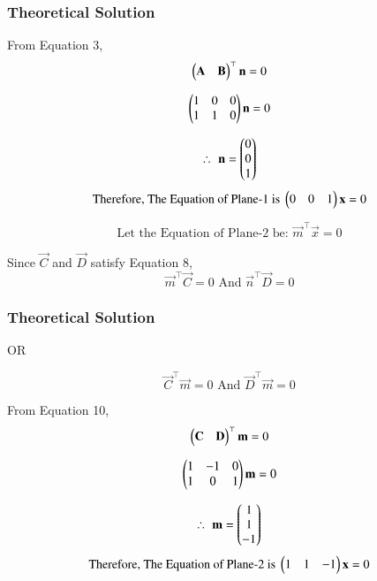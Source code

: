 \documentclass{beamer}
\begin{document}
\begin{frame}[fragile]
\frametitle{Theoretical Solution}
From Equation 3,
\begin{equation}
    \begin{pmatrix}\mathbf{A} & \mathbf{B}\end{pmatrix}^\top \mathbf{n} = 0
\end{equation}

\begin{equation}
    \begin{pmatrix} 1 & 0 & 0 \\ 1 & 1 & 0\end{pmatrix} \mathbf{n}= 0
\end{equation}

\begin{equation}
    \therefore \, \, \mathbf{n} = \begin{pmatrix}0 \\ 0 \\ 1\end{pmatrix}
\end{equation}
\begin{equation}
    \text{Therefore, The Equation of Plane-1 is } \begin{pmatrix}0 & 0 & 1\end{pmatrix}\mathbf{x} = 0
\end{equation}

\begin{equation}
\text{Let the Equation of Plane-2 be: } \vec{m}^\top\vec{x}=0
\end{equation}

Since $\vec{C}$ and $\vec{D}$ satisfy Equation 8,
\begin{equation}
    \vec{m}^\top\vec{C}=0 \text{ And } \vec{n}^\top\vec{D}=0
\end{equation}

\end{frame}




\begin{frame}[fragile]
\frametitle{Theoretical Solution}
\begin{center}
    OR
\end{center}

\begin{equation}
    \vec{C}^\top\vec{m}=0 \text{ And } \vec{D}^\top\vec{m}=0
\end{equation}

From Equation 10,
\begin{equation}
    \begin{pmatrix}\mathbf{C} & \mathbf{D}\end{pmatrix}^\top \mathbf{m} = 0
\end{equation}

\begin{equation}
    \begin{pmatrix} 1 & -1 & 0 \\ 1 & 0 & 1\end{pmatrix} \mathbf{m}= 0
\end{equation}

\begin{equation}
    \therefore \, \, \mathbf{m} = \begin{pmatrix}1 \\ 1 \\ -1\end{pmatrix}
\end{equation}
\begin{equation}
    \text{Therefore, The Equation of Plane-2 is } \begin{pmatrix}1 & 1 & -1\end{pmatrix}\mathbf{x} = 0
\end{equation}\\\\

\end{frame}
\end{document}
